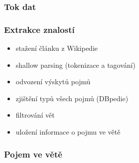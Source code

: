\documentclass[xcolor=svgnames]{beamer}
\begin{document}
\begin{frame}
\frametitle{Tok dat}
\end{frame}
\begin{frame}
\frametitle{Extrakce znalostí}
\begin{itemize}
\item stažení článku z Wikipedie
\item shallow parsing (tokenizace a tagování)
\item odvození výskytů pojmů
\item zjištění typů všech pojmů (DBpedie)
\item filtrování vět
\item uložení informace o pojmu ve větě
\end{itemize}
\end{frame}
\begin{frame}
\frametitle{Pojem ve větě}
\end{frame}
\end{document}
